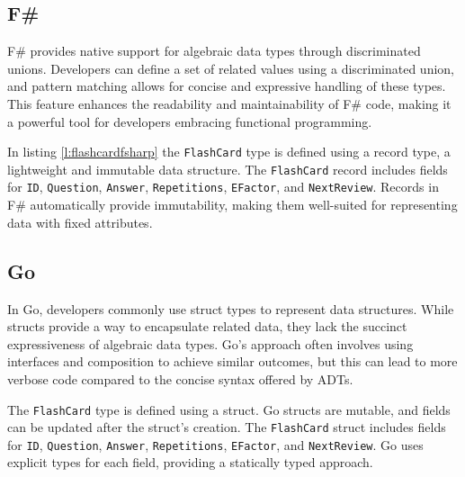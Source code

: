         \subsection*{F\#}
        F\# provides native support for algebraic data types through discriminated unions. Developers can define a set of related values using a discriminated union, and pattern matching allows for concise and expressive handling of these types. This feature enhances the readability and maintainability of F\# code, making it a powerful tool for developers embracing functional programming.


        In listing \ref{l:flashcardfsharp} the \texttt{FlashCard} type is defined using a record type, a lightweight and immutable data structure. The \texttt{FlashCard} record includes fields for \texttt{ID}, \texttt{Question}, \texttt{Answer}, \texttt{Repetitions}, \texttt{EFactor}, and \texttt{NextReview}. Records in F\# automatically provide immutability, making them well-suited for representing data with fixed attributes.


        \subsection*{Go}
        In Go, developers commonly use struct types to represent data structures. While structs provide a way to encapsulate related data, they lack the succinct expressiveness of algebraic data types. Go's approach often involves using interfaces and composition to achieve similar outcomes, but this can lead to more verbose code compared to the concise syntax offered by ADTs.

        The \texttt{FlashCard} type is defined using a struct. Go structs are mutable, and fields can be updated after the struct's creation. The \texttt{FlashCard} struct includes fields for \texttt{ID}, \texttt{Question}, \texttt{Answer}, \texttt{Repetitions}, \texttt{EFactor}, and \texttt{NextReview}. Go uses explicit types for each field, providing a statically typed approach.

